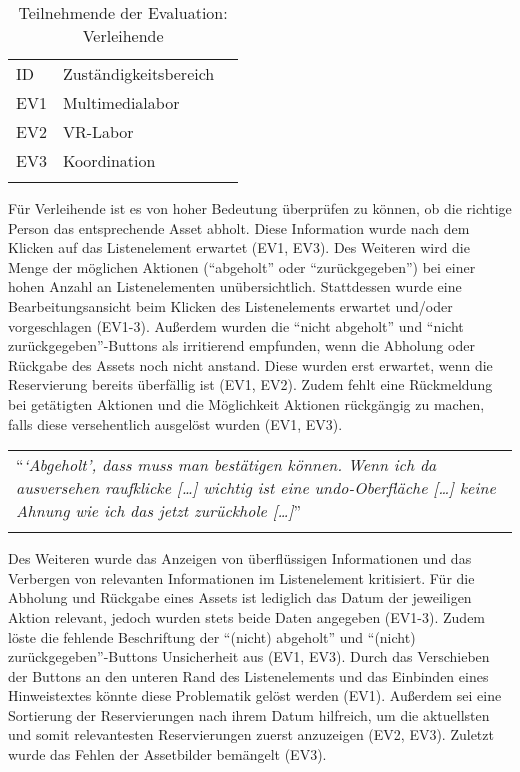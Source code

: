 \begin{table}[h]
        \centering
        \caption{Teilnehmende der Evaluation: Verleihende}
        \begin{tabular}{lll}
                \arrayrulecolor{maincolor}\hline
                \sffamily\color{maincolor}ID &
                \sffamily\color{maincolor}Zuständigkeitsbereich \\
                \arrayrulecolor{maincolor}\hline
                EV1                          & Multimedialabor  \\
                EV2                          & VR-Labor         \\
                EV3                          & Koordination               \\
                \arrayrulecolor{maincolor}\hline
        \end{tabular}
        \label{table:vzwei}
\end{table}

Für Verleihende ist es von hoher Bedeutung überprüfen zu können, ob die richtige Person das
entsprechende Asset abholt. Diese Information wurde nach dem Klicken auf das Listenelement erwartet
(EV1, EV3). Des Weiteren wird die Menge der möglichen Aktionen (\enquote{abgeholt} oder
\enquote{zurückgegeben}) bei einer hohen Anzahl an Listenelementen unübersichtlich. Stattdessen
wurde eine Bearbeitungsansicht beim Klicken des Listenelements erwartet und/oder vorgeschlagen
(EV1-3). Außerdem wurden die \enquote{nicht abgeholt} und \enquote{nicht zurückgegeben}-Buttons als
irritierend empfunden, wenn die Abholung oder Rückgabe des Assets noch nicht anstand. Diese wurden
erst erwartet, wenn die Reservierung bereits überfällig ist (EV1, EV2). Zudem fehlt eine Rückmeldung
bei getätigten Aktionen und die Möglichkeit Aktionen rückgängig zu machen, falls diese versehentlich
ausgelöst wurden (EV1, EV3).

\begin{longtable}{p{}} \arrayrulecolor{maincolor}\hline
        \enquote{\textit{\enquote{Abgeholt}, dass muss man bestätigen können. Wenn ich
        da ausversehen raufklicke [\dots] wichtig ist eine undo-Oberfläche [\dots]
        keine Ahnung wie ich das jetzt zurückhole [\dots]}} \\
        \arrayrulecolor{maincolor}\hline
\end{longtable}

Des Weiteren wurde das Anzeigen von überflüssigen Informationen und das Verbergen von relevanten
Informationen im Listenelement kritisiert. Für die Abholung und Rückgabe eines Assets ist lediglich
das Datum der jeweiligen Aktion relevant, jedoch wurden stets beide Daten angegeben (EV1-3). Zudem
löste die fehlende Beschriftung der \enquote{(nicht) abgeholt} und \enquote{(nicht)
        zurückgegeben}-Buttons Unsicherheit aus (EV1, EV3). Durch das Verschieben der Buttons an den unteren
Rand des Listenelements und das Einbinden eines Hinweistextes könnte diese Problematik gelöst
werden (EV1). Außerdem sei eine Sortierung der Reservierungen nach ihrem Datum hilfreich, um die
aktuellsten und somit relevantesten Reservierungen zuerst anzuzeigen (EV2, EV3). Zuletzt wurde das Fehlen
der Assetbilder bemängelt (EV3).

